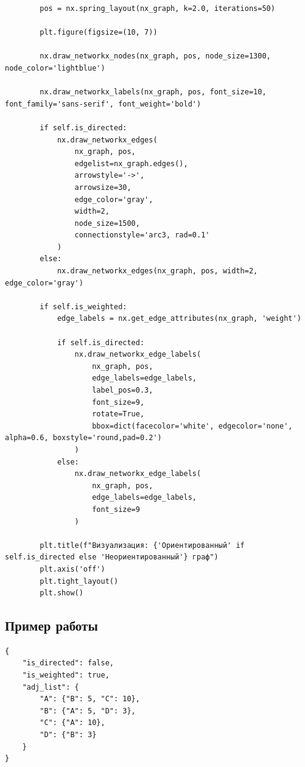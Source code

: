 \documentclass[referat]{SCWorks}
\begin{document}
\begin{verbatim}
        pos = nx.spring_layout(nx_graph, k=2.0, iterations=50)

        plt.figure(figsize=(10, 7))

        nx.draw_networkx_nodes(nx_graph, pos, node_size=1300, node_color='lightblue')

        nx.draw_networkx_labels(nx_graph, pos, font_size=10, font_family='sans-serif', font_weight='bold')

        if self.is_directed:
            nx.draw_networkx_edges(
                nx_graph, pos,
                edgelist=nx_graph.edges(),
                arrowstyle='->',
                arrowsize=30,
                edge_color='gray',
                width=2,
                node_size=1500,
                connectionstyle='arc3, rad=0.1'
            )
        else:
            nx.draw_networkx_edges(nx_graph, pos, width=2, edge_color='gray')

        if self.is_weighted:
            edge_labels = nx.get_edge_attributes(nx_graph, 'weight')

            if self.is_directed:
                nx.draw_networkx_edge_labels(
                    nx_graph, pos,
                    edge_labels=edge_labels,
                    label_pos=0.3,
                    font_size=9,
                    rotate=True,
                    bbox=dict(facecolor='white', edgecolor='none', alpha=0.6, boxstyle='round,pad=0.2')
                )
            else:
                nx.draw_networkx_edge_labels(
                    nx_graph, pos,
                    edge_labels=edge_labels,
                    font_size=9
                )

        plt.title(f"Визуализация: {'Ориентированный' if self.is_directed else 'Неориентированный'} граф")
        plt.axis('off')
        plt.tight_layout()
        plt.show()

    \end{verbatim}

    \subsection{Пример работы}
    \begin{verbatim}
{
    "is_directed": false,
    "is_weighted": true,
    "adj_list": {
        "A": {"B": 5, "C": 10},
        "B": {"A": 5, "D": 3},
        "C": {"A": 10},
        "D": {"B": 3}
    }
}
    \end{verbatim}
\end{document}

